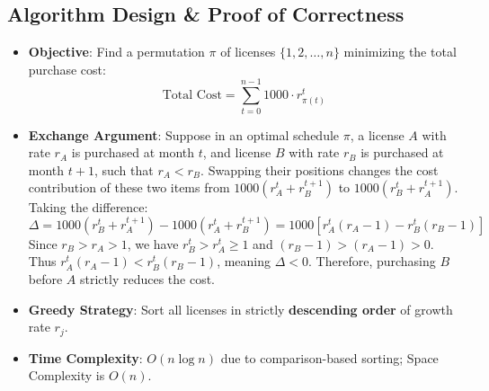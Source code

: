\documentclass[12pt]{article}
\begin{document}
\subsection*{Algorithm Design \& Proof of Correctness}
\begin{itemize}
    \item \textbf{Objective}: Find a permutation $\pi$ of licenses $\{1, 2, \dots, n\}$ minimizing the total purchase cost:
    \[
    \text{Total Cost} = \sum_{t=0}^{n-1} 1000 \cdot r_{\pi(t)}^t
    \]
    \item \textbf{Exchange Argument}: Suppose in an optimal schedule $\pi$, a license $A$ with rate $r_A$ is purchased at month $t$, and license $B$ with rate $r_B$ is purchased at month $t+1$, such that $r_A < r_B$. Swapping their positions changes the cost contribution of these two items from $1000(r_A^t + r_B^{t+1})$ to $1000(r_B^t + r_A^{t+1})$. Taking the difference:
    \[
    \Delta = 1000(r_B^t + r_A^{t+1}) - 1000(r_A^t + r_B^{t+1}) = 1000 \left[ r_A^t(r_A - 1) - r_B^t(r_B - 1) \right]
    \]
    Since $r_B > r_A > 1$, we have $r_B^t > r_A^t \ge 1$ and $(r_B - 1) > (r_A - 1) > 0$. Thus $r_A^t(r_A - 1) < r_B^t(r_B - 1)$, meaning $\Delta < 0$. Therefore, purchasing $B$ before $A$ strictly reduces the cost.
    \item \textbf{Greedy Strategy}: Sort all licenses in strictly \textbf{descending order} of growth rate $r_j$.
    \item \textbf{Time Complexity}: $O(n \log n)$ due to comparison-based sorting; Space Complexity is $O(n)$.
\end{itemize}
\end{document}
